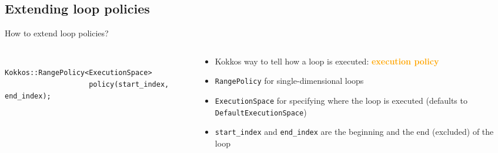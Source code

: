 \documentclass[aspectratio=169]{beamer}
\newcommand{\highlight}[1]{\textcolor{orange}{\textbf{#1}}}
\begin{document}

\subsection{Extending loop policies}


\begin{frame}[fragile]{How to extend loop policies?}
    \begin{columns}
        \begin{column}{0.55\linewidth}
            \begin{verbatim}
                Kokkos::RangePolicy<ExecutionSpace>
                    policy(start_index, end_index);
            \end{verbatim}
        \end{column}
        \begin{column}{0.45\linewidth}
            \begin{itemize}
                \item Kokkos way to tell how a loop is executed: \highlight{execution policy}
                \item \texttt{RangePolicy} for single-dimensional loops
                \item \texttt{ExecutionSpace} for specifying where the loop is executed (defaults to \texttt{DefaultExecutionSpace})
                \item \texttt{start\_index} and \texttt{end\_index} are the beginning and the end (excluded) of the loop
            \end{itemize}
        \end{column}
    \end{columns}
\end{frame}

\end{document}
